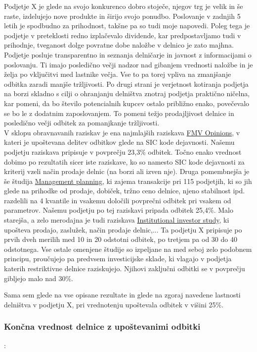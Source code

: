 \documentclass[12pt,a4paper]{amsart}
\theoremstyle{definition} %
\theoremstyle{plain} %
\begin{document}
\begin{itemize}
Podjetje X je glede na svojo konkurenco dobro stoječe, njegov trg je velik in še raste, izdelujejo nove produkte in širijo svojo ponudbo. Poslovanje v zadnjih 5 letih je spodbudno za prihodnost, takšne pa so tudi moje napovedi. Poleg tega je podjetje v preteklosti redno izplačevalo dividende, kar predpostavljamo tudi v prihodnje, tveganost dolge povratne dobe naložbe v delnico je zato majhna. Podjetje posluje transparentno in seznanja delničarje in javnost z informacijami o poslovanju. Ti imajo posledično večji nadzor nad gibanjem vrednosti naložbe in je želja po vključitvi med lastnike večja. Vse to pa torej vpliva na zmanjšanje odbitka zaradi manjše tržljivosti. Po drugi strani je verjetnost kotiranja podjetja na borzi skladno s cilji o ohranjanju delništva znotraj podjetja praktično ničelna, kar pomeni, da bo število potencialnih kupcev ostalo približno enako, povečevalo se bo le z dodatnim zaposlovanjem. To pomeni težjo prodajljivost delnice in posledično večji odbitek za pomanjkanje tržljivosti.\\
V sklopu obravnavanih raziskav je ena najmlajših raziskava \underline{FMV Opinions}, v kateri je upoštevana delitev odbitkov glede na SIC kode dejavnosti. Našemu podjetju raziskava pripisuje v povprečju 23,3\% odbitek. Točno enako vrednost dobimo po rezultatih sicer iste raziskave, ko so namesto SIC kode dejavnosti za kriterij vzeli način prodaje delnic (na borzi ali izven nje). Druga pomembnejša je še študija \underline{Management planning}, ki zajema transakcije pri 115 podjetjih, ki so jih glede na prihodke od prodaje, dobiček, tržno ceno delnice, njeno stabilnost ipd. razdelili na 4 kvantile in vsakemu določili povprečni odbitek pri vsakem od parametrov. Našemu podjetju po tej raziskavi pripada odbitek 25,4\%. Malo starejša, a zelo merodajna je tudi raziskava \underline{Institutional investor study}, ki upošteva prodajo, zaslužek, način prodaje delnic,... Ta podjetju X pripisuje po prvih dveh merilih med 10 in 20 odstotni odbitek, po tretjem pa od 30 do 40 odstotnega. Vse ostale omenjene študije so izpeljane na med seboj zelo podobnem principu, proučujejo pa predvsem investicijske sklade, ki vlagajo v podjetja katerih restriktivne delnice raziskujejo. Njihovi zaključni odbitki se v povprečju gibljejo malo nad 30\%.\par
Sama sem glede na vse opisane rezultate in glede na zgoraj navedene lastnosti delništva v podjetju X, pri vrednotenju upoštevala odbitek v višini 25\%.\\


\subsubsection{Končna vrednost delnice z upoštevanimi odbitki}:\\


\end{itemize}
\end{document}
